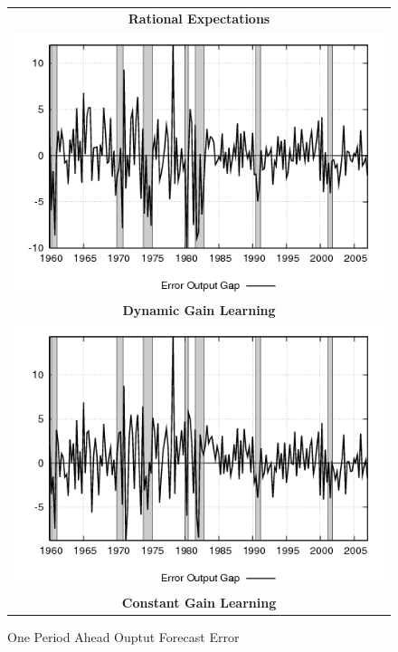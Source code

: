 \documentclass[12pt]{article}
\begin{document}
\begin{figure}[ht]
\caption{One Period Ahead Ouptut Forecast Error}\label{fg:outputerr}
\begin{center}
\begin{tabular}{c}
\textbf{Rational Expectations} \\  
\includegraphics[scale=0.5]{results_re/output_err.png} \\
\textbf{Dynamic Gain Learning} \\
\includegraphics[scale=0.5]{results_dg8_wlsinit/output_err.png} \\
\textbf{Constant Gain Learning} \\

\end{tabular}
\end{center}
\end{figure}
\end{document}
